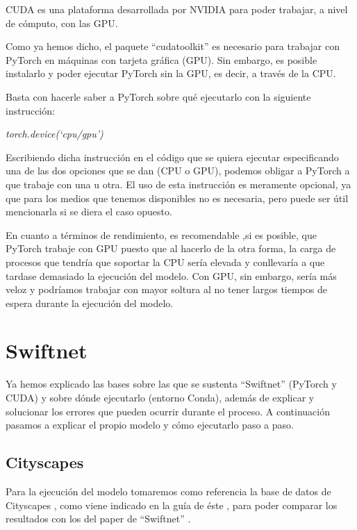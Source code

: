 CUDA \cite{cuda} es una plataforma desarrollada por NVIDIA para poder trabajar, a nivel de cómputo, con las \ac{GPU}.

Como ya hemos dicho, el paquete ``cudatoolkit'' es necesario para trabajar con PyTorch en máquinas con tarjeta gráfica (\ac{GPU}). Sin embargo, es posible instalarlo y poder ejecutar PyTorch sin la \ac{GPU}, es decir, a través de la \ac{CPU}.

Basta con hacerle saber a PyTorch sobre qué ejecutarlo con la siguiente instrucción:

\begin{center}
\textit{torch.device(`cpu/gpu')}
\end{center}

Escribiendo dicha instrucción en el código que se quiera ejecutar especificando una de las dos opciones que se dan (\ac{CPU} o \ac{GPU}), podemos obligar a PyTorch a que trabaje con una u otra. El uso de esta instrucción es meramente opcional, ya que para los medios que tenemos disponibles no es necesaria, pero puede ser útil mencionarla si se diera el caso opuesto.

En cuanto a términos de rendimiento, es recomendable ,si es posible, que PyTorch trabaje con \ac{GPU} puesto que al hacerlo de la otra forma, la carga de procesos que tendría que soportar la \ac{CPU} sería elevada y conllevaría a que tardase demasiado la ejecución del modelo. Con \ac{GPU}, sin embargo, sería más veloz y podríamos trabajar con mayor soltura al no tener largos tiempos de espera durante la ejecución del modelo.


\section{Swiftnet}

Ya hemos explicado las bases sobre las que se sustenta ``Swiftnet'' (PyTorch y CUDA) y sobre dónde ejecutarlo (entorno Conda), además de explicar y solucionar los errores que pueden ocurrir durante el proceso. A continuación pasamos a explicar el propio modelo y cómo ejecutarlo paso a paso.

\subsection{Cityscapes}

Para la ejecución del modelo tomaremos como referencia la base de datos de Cityscapes \cite{cityscapes}, como viene indicado en la guía de éste \cite{github_swiftnet}, para poder comparar los resultados con los del paper de ``Swiftnet'' \cite{swiftnet}.


